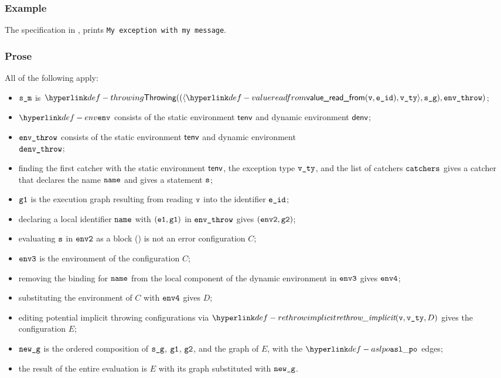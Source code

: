 \subsubsection{Example}
The specification in , prints \texttt{My exception with my message}.

\subsubsection{Prose}
All of the following apply:
\begin{itemize}
  \item $\texttt{s\_m}$ is $\Throwing((\langle \valuereadfrom(\vv, \eid), \vvty \rangle, \sg), \envthrow)$;
  \item $\env$ consists of the static environment $\textsf{tenv}$ and dynamic environment $\textsf{denv}$;
  \item $\texttt{env\_throw}$ consists of the static environment $\textsf{tenv}$ and dynamic environment \\ $\texttt{denv\_throw}$;
  \item finding the first catcher with the static environment $\textsf{tenv}$, the exception type $\texttt{v\_ty}$,
  and the list of catchers $\texttt{catchers}$ gives a catcher that declares the name $\texttt{name}$ and gives a statement $\texttt{s}$;
  \item $\texttt{g1}$ is the execution graph resulting from reading $\texttt{v}$ into the identifier $\texttt{e\_id}$;
  \item declaring a local identifier $\texttt{name}$ with $(\texttt{e1}, \texttt{g1})$ in $\texttt{env\_throw}$ gives $(\texttt{env2}, \texttt{g2})$;
  \item evaluating $\texttt{s}$ in $\texttt{env2}$ as a block () is not an error
  configuration $C$\ProseOrError;
  \item $\texttt{env3}$ is the environment of the configuration $C$;
  \item removing the binding for $\texttt{name}$ from the local component of the dynamic environment in $\texttt{env3}$
  gives $\texttt{env4}$;
  \item substituting the environment of $C$ with $\texttt{env4}$ gives $D$;
  \item editing potential implicit throwing configurations via $\rethrowimplicit(\vv, \vvty, D)$
  gives the configuration $E$;
  \item $\texttt{new\_g}$ is the ordered composition of $\texttt{s\_g}$, $\texttt{g1}$, $\texttt{g2}$, and the graph of $E$,
  with the $\aslpo$ edges;
  \item the result of the entire evaluation is $E$ with its graph substituted with $\texttt{new\_g}$.
\end{itemize}
